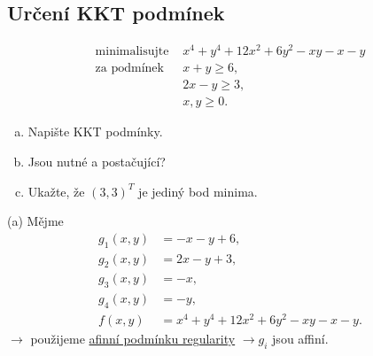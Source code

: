 \subsection{Určení KKT podmínek}
\begin{align*}
    \text{minimalisujte } &x^4 + y^4 + 12 x^2 + 6 y^2 - xy - x - y \\
    \text{za podmínek } &x + y \geq 6, \\
    &2x-y \geq 3, \\
    &x, y \geq 0.
\end{align*}
\begin{enumerate}[(a)]
    \item Napište KKT podmínky.
    \item Jsou nutné a postačující?
    \item Ukažte, že $(3, 3)^T$ je jediný bod minima.
\end{enumerate}
(a) Mějme
\begin{align*}
    g_1(x,y) &= -x-y+6, \\
    g_2(x,y) &= 2x-y+3, \\
    g_3(x,y) &= -x, \\
    g_4(x,y) &= -y, \\
    f(x,y) &= x^4 + y^4 + 12 x^2 + 6 y^2 - xy - x - y.
\end{align*}
$\rightarrow$ použijeme \hyperref[afinniPodm]{afinní podmínku regularity} $\rightarrow g_i$ jsou affiní.

